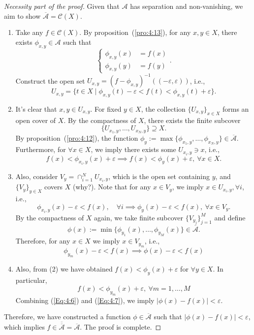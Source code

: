\begin{proof}[Necessity part of the proof]
Given that $\mathcal{A}$ has separation and non-vanishing,
we aim to show $\overline{\mathcal{A}}=\mathcal{C}(X)$.
\begin{enumerate}
\item
Take any $f\in\mathcal{C}(X)$. 
By proposition~(\ref{pro:4:13}), for any $x,y\in X$, there exists $\phi_{x,y}\in\mathcal{A}$ such that
\[
\left\{
\begin{aligned}
\phi_{x,y}(x)&=f(x)\\
\phi_{x,y}(y)&=f(y)
\end{aligned}
\right..
\]
Construct the open set $U_{x,y} = (f-\phi_{x,y})^{-1}((-\varepsilon,\varepsilon))$, i.e., 
\[
U_{x,y} = \{t\in X\mid \phi_{x,y}(t)-\varepsilon
<f(t)<
\phi_{x,y}(t)+\varepsilon
\}.
\]
\item
It's clear that $x,y\in U_{x,y}$. For fixed $y\in X$, the collection $\{U_{x,y}\}_{x\in X}$ forms an open cover of $X$. By the compactness of $X$, there exists the finite subcover
\[
\{U_{x_1,y},\dots,U_{x_N,y}\}\supseteq X.
\]
By proposition~(\ref{pro:4:12}), the function $\phi_y:=\max\{\phi_{x_1,y},\dots,\phi_{x_N,y}\}\in\overline{\mathcal{A}}$. Furthermore, for $\forall x\in X$, we imply there exists some $U_{x_i,y}\ni x$, i.e.,
\[
f(x)<\phi_{x_i,y}(x)+\varepsilon\implies
f(x)<\phi_y(x)+\varepsilon, \ \forall x\in X.
\]
\item
Also, consider $V_y = \cap_{i=1}^NU_{x_i,y}$, which is the open set containing $y$, and $\{V_y\}_{y\in X}$ covers $X$ (why?). Note that for any $x\in V_y$, we imply $x\in U_{x_i,y},\forall i$, i.e.,
\[
\phi_{x_i,y}(x)-\varepsilon<f(x),\quad \forall i\implies
\phi_y(x)-\varepsilon<f(x),\ \forall x\in V_y.
\]
By the compactness of $X$ again, we take finite subcover $\{V_{y_j}\}_{j=1}^M$ and define
\[
\phi(x):=\min\{\phi_{y_1}(x),\dots,\phi_{y_M}(x)\}\in\overline{\mathcal{A}}.
\]
Therefore, for any $x\in X$ we imply $x\in V_{y_m}$, i.e.,
\begin{equation}\label{Eq:4:6}
\phi_{y_m}(x)-\varepsilon<f(x)\implies\phi(x)-\varepsilon<f(x)
\end{equation}
\item
Also, from (2) we have obtained $f(x)<\phi_y(x)+\varepsilon$ for $\forall y\in X$. In particular,
\begin{equation}\label{Eq:4:7}
f(x)<\phi_{y_m}(x)+\varepsilon,\ \forall m=1,\dots,M
\end{equation}
Combining (\ref{Eq:4:6}) and (\ref{Eq:4:7}), we imply $|\phi(x)-f(x)|<\varepsilon$.
\end{enumerate}
Therefore, we have constructed a function $\phi\in\overline{\mathcal{A}}$ such that $|\phi(x)-f(x)|<\varepsilon$, which implies $f\in\overline{\overline{\mathcal{A}}}=\overline{\mathcal{A}}$. The proof is complete.
\end{proof}























